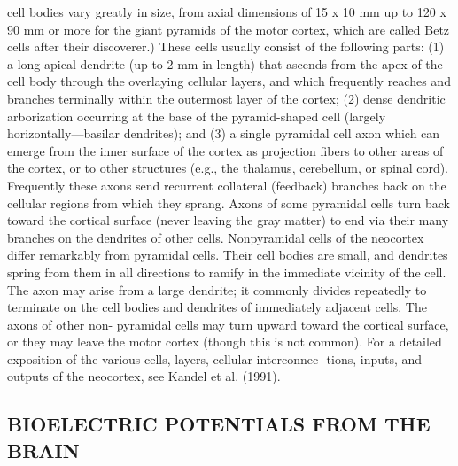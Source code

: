 cell bodies vary greatly in size, from axial dimensions of 15 x 10 mm up to
120 x 90 mm or more for the giant pyramids of the motor cortex, which are
called Betz cells after their discoverer.) These cells usually consist of the
following parts: (1) a long apical dendrite (up to 2 mm in length) that ascends
from the apex of the cell body through the overlaying cellular layers, and
which frequently reaches and branches terminally within the outermost
layer of the cortex; (2) dense dendritic arborization occurring at the base
of the pyramid-shaped cell (largely horizontally—basilar dendrites); and (3)
a single pyramidal cell axon which can emerge from the inner surface of the
cortex as projection fibers to other areas of the cortex, or to other structures
(e.g., the thalamus, cerebellum, or spinal cord). Frequently these axons send
recurrent collateral (feedback) branches back on the cellular regions from
which they sprang. Axons of some pyramidal cells turn back toward the
cortical surface (never leaving the gray matter) to end via their many
branches on the dendrites of other cells.
Nonpyramidal cells of the neocortex differ remarkably from pyramidal
cells. Their cell bodies are small, and dendrites spring from them in all
directions to ramify in the immediate vicinity of the cell. The axon may arise
from a large dendrite; it commonly divides repeatedly to terminate on the cell
bodies and dendrites of immediately adjacent cells. The axons of other non-
pyramidal cells may turn upward toward the cortical surface, or they may leave
the motor cortex (though this is not common).
For a detailed exposition of the various cells, layers, cellular interconnec-
tions, inputs, and outputs of the neocortex, see Kandel et al. (1991).

\subsection{BIOELECTRIC POTENTIALS FROM THE BRAIN}

